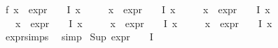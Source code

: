 \begin{isabellebody}
\ f{}{\isacharcolon}{\kern0pt}\ {\isachardoublequoteopen}{\isasymforall}x\ {\isasymin}\ {\isacharparenleft}{\kern0pt}{\isacharparenleft}{\kern0pt}expr{\isacharunderscore}{\kern0pt}{}\ {\isasymcirc}\ {\isasymPhi}{\isacharparenright}{\kern0pt}\ {\isacharbackquote}{\kern0pt}\ I{\isacharparenright}{\kern0pt}{\isachardot}{\kern0pt}\ x\ {\isasymle}\ {}{\isachardoublequoteclose}\isanewline
\ \ \ {\isachardoublequoteopen}{\isasymforall}x\ {\isasymin}\ {\isacharparenleft}{\kern0pt}{\isacharparenleft}{\kern0pt}expr{\isacharunderscore}{\kern0pt}{}\ {\isasymcirc}\ {\isasymPhi}{\isacharparenright}{\kern0pt}\ {\isacharbackquote}{\kern0pt}\ I{\isacharparenright}{\kern0pt}{\isachardot}{\kern0pt}\ x\ {\isasymle}\ {}{\isachardoublequoteclose}\isanewline
\ \ \ {\isachardoublequoteopen}{\isasymforall}x\ {\isasymin}\ {\isacharparenleft}{\kern0pt}{\isacharparenleft}{\kern0pt}expr{\isacharunderscore}{\kern0pt}{}\ {\isasymcirc}\ {\isasymPhi}{\isacharparenright}{\kern0pt}\ {\isacharbackquote}{\kern0pt}\ I{\isacharparenright}{\kern0pt}{\isachardot}{\kern0pt}\ x\ {\isasymle}\ {}{\isachardoublequoteclose}\isanewline
\ \ \ {\isachardoublequoteopen}{\isasymforall}x\ {\isasymin}\ {\isacharparenleft}{\kern0pt}{\isacharparenleft}{\kern0pt}expr{\isacharunderscore}{\kern0pt}{}\ {\isasymcirc}\ {\isasymPhi}{\isacharparenright}{\kern0pt}\ {\isacharbackquote}{\kern0pt}\ I{\isacharparenright}{\kern0pt}{\isachardot}{\kern0pt}\ x\ {\isasymle}\ {}{\isachardoublequoteclose}\isanewline
\ \ \ {\isachardoublequoteopen}{\isasymforall}x\ {\isasymin}\ {\isacharparenleft}{\kern0pt}{\isacharparenleft}{\kern0pt}expr{\isacharunderscore}{\kern0pt}{}\ {\isasymcirc}\ {\isasymPhi}{\isacharparenright}{\kern0pt}\ {\isacharbackquote}{\kern0pt}\ I{\isacharparenright}{\kern0pt}{\isachardot}{\kern0pt}\ x\ {\isasymle}\ {}{\isachardoublequoteclose}\isanewline
\ \ \ {\isachardoublequoteopen}{\isasymforall}x\ {\isasymin}\ {\isacharparenleft}{\kern0pt}{\isacharparenleft}{\kern0pt}expr{\isacharunderscore}{\kern0pt}{}\ {\isasymcirc}\ {\isasymPhi}{\isacharparenright}{\kern0pt}\ {\isacharbackquote}{\kern0pt}\ I{\isacharparenright}{\kern0pt}{\isachardot}{\kern0pt}\ x\ {\isasymle}\ \ {}{\isachardoublequoteclose}\isanewline
\ \ \ \ \isamarkupfalse%
\ expr{\isachardot}{\kern0pt}simps\ \isamarkupfalse%
\ simp{\isacharplus}{\kern0pt}\isanewline
{}\isamarkupfalse%
\ {\isachardoublequoteopen}Sup\ {\isacharparenleft}{\kern0pt}{\isacharparenleft}{\kern0pt}expr{\isacharunderscore}{\kern0pt}{}\ {\isasymcirc}\ {\isasymPhi}{\isacharparenright}{\kern0pt}\ {\isacharbackquote}{\kern0pt}\ I{\isacharparenright}{\kern0pt}\ {\isasymle}\ {}{\isachardoublequoteclose}\isanewline

\end{isabellebody}

